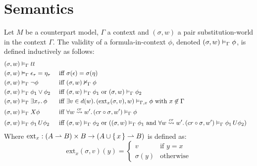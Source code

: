 \section{Semantics}

\begin{definition}\label{def:fosemantic}
Let $M$ be a counterpart model, $\Gamma$ a context and $(\sigma, w)$ a pair substitution-world in the context $\Gamma$.
The validity of a formula-in-context $\phi$, denoted $({\sigma}, {w}) \vDash_{\Gamma} {\phi}$, is defined inductively as follows:
\begin{align*}
  (\sigma, w) &\vDash_\Gamma tt \\
  (\sigma, w) &\vDash_\Gamma \epsilon_\tau = \eta_\tau &&\text{ iff } \sigma(\epsilon) = \sigma(\eta) \\
  (\sigma, w) &\vDash_\Gamma \neg\phi &&\text{ iff } ({\sigma}, {w}) \nvDash_{\Gamma} {\phi} \\
  (\sigma, w) &\vDash_\Gamma \phi_1 \lor \phi_2
      &&\text{ iff } ({\sigma}, {w}) \vDash_{\Gamma} {\phi_1} \text{ or } ({\sigma}, {w}) \vDash_{\Gamma} {\phi_2} \\
  (\sigma, w) &\vDash_\Gamma \exists {x_\tau} \ldotp {\phi}
      &&\text{ iff } \exists {v \in d(w)} \ldotp {({\text{ext}_x(\sigma, v)}, {w}) \vDash_{\Gamma, x} {\phi}}
      \text{ with } x \not\in \Gamma \\
  (\sigma, w) &\vDash_\Gamma X{\phi}
      &&\text{ iff } \forall {w \overset{cr}{\rightsquigarrow} w'} \ldotp {({cr \circ \sigma}, {w'}) \vDash_{\Gamma} {\phi}} \\
  (\sigma, w) &\vDash_\Gamma {\phi_1}\,U {\phi_2}
      &&\text{ iff } ({\sigma}, {w}) \vDash_{\Gamma} {\phi_2} \text{ or } (({\sigma}, {w}) \vDash_{\Gamma} {\phi_1}
          \text { and } \forall {w \overset{cr}{\rightsquigarrow} w'} \ldotp {({cr \circ \sigma}, {w'}) \vDash_{\Gamma} {{\phi_1}\,U {\phi_2}}}) \\
\end{align*}
  Where $\text{ext}_x : (A \rightharpoonup B) \times B \to (A \cup \set{x} \rightharpoonup B)$ is defined as:
  \[
    \text{ext}_x(\sigma, v)(y) = \begin{cases} v & \text{if } y = x \\ \sigma(y) & \text{otherwise}\end{cases}
  \]
\end{definition}

